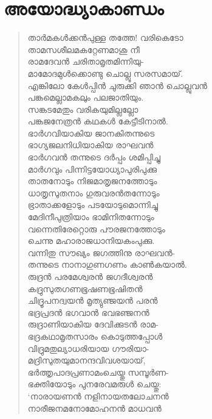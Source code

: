\chapter{അയോദ്ധ്യാകാണ്ഡം}

\begin{verse}
താര്‍മകള്‍ക്കന്‍പുള്ള തത്തേ! വരികെടോ\\
താമസശീലമകറ്റേണമാശു നീ\\
രാമദേവന്‍ ചരിതാമൃതമിന്നിയു-\\
മാമോദമുള്‍ക്കൊണ്ടു ചൊല്ലൂ സരസമായ്.\\
എങ്കിലോ കേള്‍പ്പിന്‍ ചുരുക്കി ഞാന്‍ ചൊല്ലുവന്‍\\
പങ്കമെല്ലാമകലും പലജാതിയും.\\
സങ്കടമേതും വരികയുമില്ലല്ലോ\\
പങ്കജനേത്രന്‍ കഥകള്‍ കേട്ടീടിനാല്‍.\\
ഭാര്‍ഗവിയാകിയ ജാനകിതന്നുടെ\\
ഭാഗ്യജലനിധിയാകിയ രാഘവന്‍\\
ഭാര്‍ഗവന്‍ തന്നുടെ ദര്‍പ്പം ശമിപ്പിച്ചു\\
മാര്‍ഗവും പിന്നിട്ടയോധ്യാപുരിപുക്കു\\
താതനോടും നിജമാതൃജനത്തോടും\\
ധാതൃസുതനാം ഗുരുവരന്‍തന്നോടും\\
ഭ്രാതാക്കളോടും പടയോടുമൊന്നിച്ചു\\
മേദിനീപുത്രിയാം ഭാമിനിതന്നോടും\\
വന്നെതിരേറ്റൊരു പൗരജനത്തോടും\\
ചെന്നു മഹാരാജധാനിയകംപുക്കു.\\
വന്നിതു സൗഖ്യം ജഗത്തിനു രാഘവന്‍-\\
തന്നുടെ നാനാഗുണഗണം കാണ്‍കയാല്‍.\\
രുദ്രന്‍ പരമേശ്വരന്‍ ജഗദീശ്വരന്‍\\
കദ്രുസുതഗണഭൂഷണഭൂഷിതന്‍\\
ചിദ്രൂപനദ്വയന്‍ മൃത്യുഞ്ജയന്‍ പരന്‍\\
ഭദ്രപ്രദന്‍ ഭഗവാന്‍ ഭവഭഞ്ജനന്‍\\
രുദ്രാണിയാകിയ ദേവിക്കുടന്‍ രാമ-\\
ഭദ്രകഥാമൃതസാരം കൊടുത്തപ്പോള്‍\\
വിദ്രുമതുല്യാധരിയായ ഗൗരിയാ-\\
മദ്രിസുതയുമാനന്ദവിവശയായ്,\\
ഭര്‍ത്തൃപാദപ്രണാമംചെയ്തു സമ്പൂര്‍ണ-\\
ഭക്തിയോടും പുനരേവമരുള്‍ ചെയ്തു:\\
‘നാരായണന്‍ നളിനായതലോചനന്‍\\
നാരീജനമനോമോഹനന്‍ മാധവന്‍\\

\end{verse}

